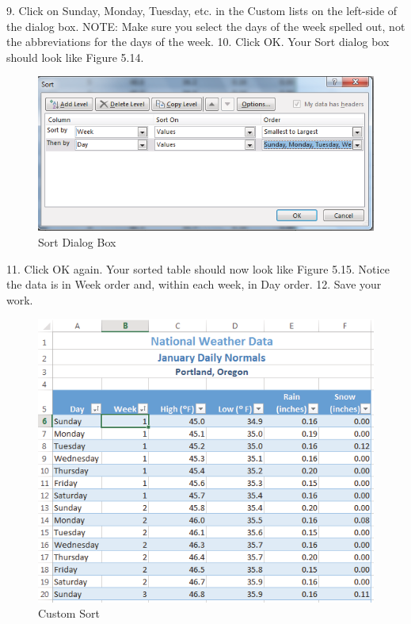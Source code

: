 9. Click on Sunday, Monday, Tuesday, etc. in the Custom lists on the left-side of the dialog box.
NOTE: Make sure you select the days of the week spelled out, not the abbreviations for the days
of the week.
10. Click OK. Your Sort dialog box should look like Figure 5.14.


\begin{figure}[H]
	\centering
	\includegraphics[width=\maxwidth{.95\linewidth}]{gfx/ch05_fig14}
	\caption{Sort Dialog Box}
	\label{05:fig14}
\end{figure}





11. Click OK again. Your sorted table should now look like Figure 5.15. Notice the data is in Week
order and, within each week, in Day order.
12. Save your work.


\begin{figure}[H]
	\centering
	\includegraphics[width=\maxwidth{.95\linewidth}]{gfx/ch05_fig15}
	\caption{Custom Sort}
	\label{05:fig15}
\end{figure}


